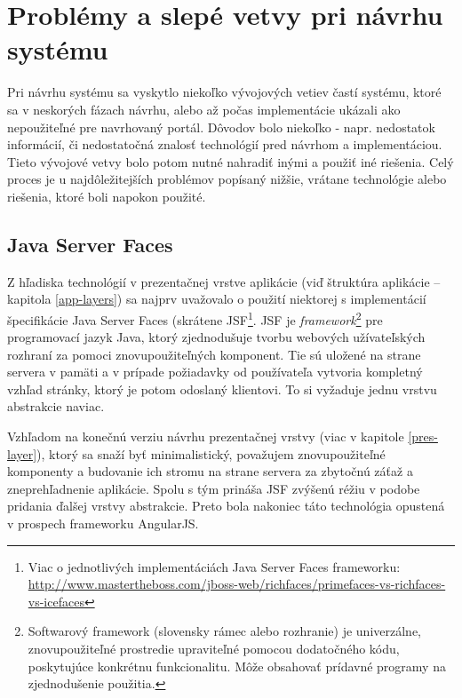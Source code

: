 \documentclass[12pt,oneside]{fithesis2}
\begin{document}
	\section{Problémy a slepé vetvy pri návrhu systému} \label{slepe-vetvy}
       		
	\par Pri návrhu systému sa vyskytlo niekoľko vývojových vetiev častí systému, ktoré sa v neskorých fázach návrhu, alebo až počas implementácie ukázali ako nepoužiteľné pre navrhovaný portál. Dôvodov bolo niekoľko - napr. nedostatok informácií, či nedostatočná znalosť technológií pred návrhom a implementáciou. Tieto vývojové vetvy bolo potom nutné nahradiť inými a použiť iné riešenia. Celý proces je u najdôležitejších problémov popísaný nižšie, vrátane technológie alebo riešenia, ktoré boli napokon použité.
	
		\subsection{Java Server Faces}
	
	\par Z hľadiska technológií v prezentačnej vrstve aplikácie (viď štruktúra aplikácie -- kapitola \ref{app-layers}) sa najprv uvažovalo o použití niektorej s implementácií špecifikácie Java Server Faces (skrátene JSF\footnote{Viac o jednotlivých implementáciách Java Server Faces frameworku: \url{http://www.mastertheboss.com/jboss-web/richfaces/primefaces-vs-richfaces-vs-icefaces}}. JSF je \textit{framework}\footnote{Softwarový framework (slovensky rámec alebo rozhranie) je univerzálne, znovupoužiteľné prostredie upraviteľné pomocou dodatočného kódu, poskytujúce konkrétnu funkcionalitu. Môže obsahovať prídavné programy na zjednodušenie použitia.} pre programovací jazyk Java, ktorý zjednodušuje tvorbu webových užívateľských rozhraní za pomoci znovupoužiteľných komponent. Tie sú uložené na strane servera v pamäti a v prípade požiadavky od používateľa vytvoria kompletný vzhľad stránky, ktorý je potom odoslaný klientovi. To si vyžaduje jednu vrstvu abstrakcie naviac\cite{hades14}. 
	\par Vzhľadom na konečnú verziu návrhu prezentačnej vrstvy (viac v kapitole \ref{pres-layer}), ktorý sa snaží byť minimalistický, považujem znovupoužiteľné komponenty a budovanie ich stromu na strane servera za zbytočnú záťaž a zneprehľadnenie aplikácie. Spolu s tým prináša JSF zvýšenú réžiu v podobe pridania ďalšej vrstvy abstrakcie. Preto bola nakoniec táto technológia opustená v prospech frameworku AngularJS.
\end{document}
